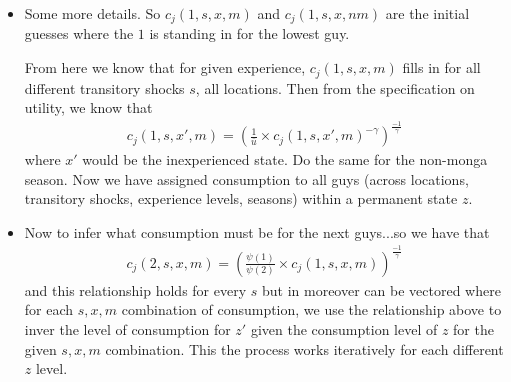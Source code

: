 \documentclass[12pt,pdftex]{article}
\begin{document}
\begin{onehalfspacing}
\begin{itemize}
\item Some more details. So $c_{j}(1, s, x, m)$ and $c_{j}(1, s, x, nm)$  are the initial guesses where the $1$ is standing in for the lowest guy. 

From here we know that for given experience, $c_{j}(1, s, x, m)$ fills in for all different transitory shocks $s$, all locations. Then from the specification on utility, we know that
\begin{align}
c_{j}(1, s, x', m)  = \left( \frac{1}{\bar u} \times c_{j}(1, s, x', m)^{-\gamma} \right)^{\frac{-1}{\gamma}}
\end{align}
where $x'$ would be the inexperienced state. Do the same for the non-monga season. Now we have assigned consumption to all guys (across locations, transitory shocks, experience levels, seasons) within a permanent state $z$. 
    
\item Now to infer what consumption must be for the next guys...so we have that 
\begin{align}
c_{j}(2, s, x, m) = \left( \frac{\psi(1)}{\psi(2)} \times  c_{j}(1, s, x, m) \right)^{\frac{-1}{\gamma}}
\end{align}
and this relationship holds for every $s$ but in moreover can be vectored where for each $s,x,m$ combination of consumption, we use the relationship above to inver the level of consumption for $z'$ given the consumption level of $z$ for the given $s,x,m$ combination. This the process works iteratively for each different $z$ level. 



\end{itemize}

\newpage






\end{onehalfspacing}
\end{document}
